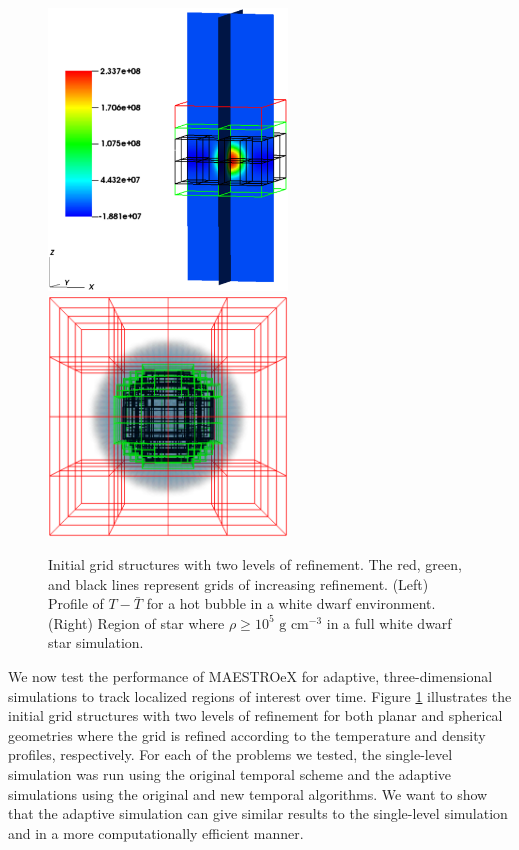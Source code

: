 \begin{figure}[htb]
\begin{center}
\includegraphics[width=2.5in]{./figs/reacting_bubble_amr} \hspace{2.5em}
\includegraphics[width=2.5in]{./figs/wdconvect_amr_3grid}
\caption{\label{fig:amr_grids} Initial grid structures with two levels of refinement.
         The red, green, and black lines represent grids of increasing refinement.
         (Left) Profile of $T - \bar{T}$ for a hot bubble in a white dwarf environment.
         (Right) Region of star where $\rho\ge 10^5 \text{ g cm}^{-3}$ in a full white dwarf star simulation. }
\end{center}
\end{figure}

We now test the performance of MAESTROeX for adaptive, three-dimensional simulations to track localized regions of interest over time. Figure \ref{fig:amr_grids} illustrates the initial grid structures with two levels of refinement for both planar and spherical geometries where the grid is refined according to the temperature and density profiles, respectively. For each of the problems we tested, the single-level simulation was run using the original temporal scheme and the adaptive simulations using the original and new temporal algorithms. We want to show that the adaptive simulation can give similar results to the single-level simulation and in a more computationally efficient manner.

